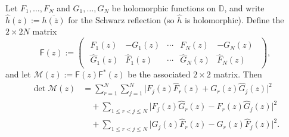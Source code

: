 \documentclass[10pt,a4paper]{amsart}
\begin{document}
\begin{thm}\label{thm:detN-CB}
Let $F_1,\ldots,F_N$ and $G_1,\ldots,G_N$ be holomorphic functions on $\mathbb{D}$, and write $\hat{h}(z) := \overline{h(\overline{z})}$ for the Schwarz reflection (so $\hat h$ is holomorphic). Define the $2 \times 2N$ matrix
\begin{equation}\label{eq:tildeF-N}
\mathsf{F}(z) :=
\begin{pmatrix}
\begin{array}{cccccc}
F_1(z) & -G_1(z) & \cdots & F_N(z) & -G_N(z) \\
\hat G_1(z) & \hat F_1(z) & \cdots & \hat G_N(z) & \hat F_N(z)
\end{array}
\end{pmatrix},
\end{equation}
and let $\mathcal{M}(z) := \mathsf{F}(z)\mathsf{F}^*(z)$ be the associated $2 \times 2$ matrix. Then
\begin{equation}\label{eq:detN-CB}
\begin{aligned}
\det\mathcal{M}(z)
&= \sum_{r=1}^{N}\sum_{j=1}^{N} \bigl| F_j(z)\hat F_r(z) + G_r(z)\hat G_j(z)\bigr|^2 \\
&\quad + \sum_{1 \le r < j \le N} \bigl| F_j(z)\hat G_r(z) - F_r(z)\hat G_j(z)\bigr|^2 \\
&\quad + \sum_{1 \le r < j \le N} \bigl| G_j(z)\hat F_r(z) - G_r(z)\hat F_j(z)\bigr|^2.
\end{aligned}
\end{equation}
\end{thm}
\end{document}
